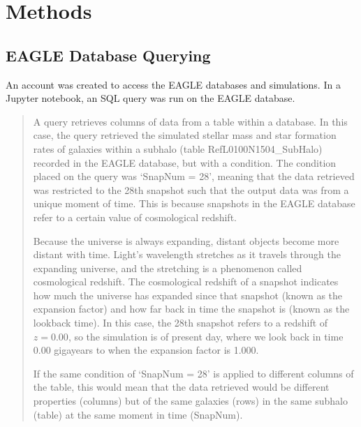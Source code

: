 \documentclass[linenumbers,trackchanges]{aastex7}
\begin{document}

\section{Methods} 
\subsection{EAGLE Database Querying}
An account was created to access the EAGLE databases and simulations. In a Jupyter notebook, an SQL query was run on the EAGLE database.

\begin{quote}
 A query retrieves columns of data from a table within a database. In this case, the query retrieved the simulated stellar mass and star formation rates of galaxies within a subhalo (table RefL0100N1504\_SubHalo) recorded in the EAGLE database, but with a condition. The condition placed on the query was `SnapNum = 28', meaning that the data retrieved was restricted to the 28th snapshot such that the output data was from a unique moment of time. This is because snapshots in the EAGLE database refer to a certain value of cosmological redshift.
 
 Because the universe is always expanding, distant objects become more distant with time. Light's wavelength stretches as it travels through the expanding universe, and the stretching is a phenomenon called cosmological redshift. The cosmological redshift of a snapshot indicates how much the universe has expanded since that snapshot (known as the expansion factor) and how far back in time the snapshot is (known as the lookback time). In this case, the 28th snapshot refers to a redshift of $z = 0.00$, so the simulation is of present day, where we look back in time 0.00 gigayears to when the expansion factor is 1.000.

If the same condition of `SnapNum = 28' is applied to different columns of the table, this would mean that the data retrieved would be different properties (columns) but of the same galaxies (rows) in the same subhalo (table) at the same moment in time (SnapNum).
\end{quote}
\end{document}
